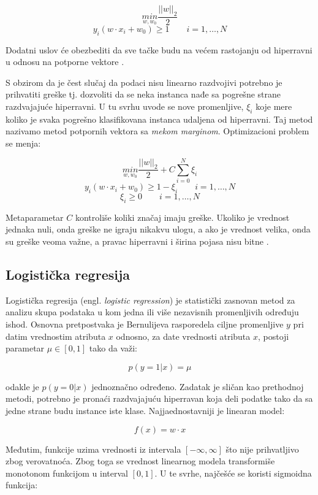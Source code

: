 $$ \underset{w, w_0}{min} \dfrac{||w||_2}{2}$$
$$ y_i(w \cdot x_i + w_0) \geq 1 \qquad i=1, \ldots, N $$
 
Dodatni uslov će obezbediti da sve tačke budu na većem rastojanju od hiperravni u odnosu na potporne vektore \cite{ml}.

S obzirom da je čest slučaj da podaci nisu linearno razdvojivi potrebno je prihvatiti greške tj. dozvoliti da se neka instanca nađe sa pogrešne strane razdvajajuće hiperravni. U tu svrhu uvode se nove promenljive, $\xi_i$ koje mere koliko je svaka pogrešno klasifikovana instanca udaljena od hiperravni. Taj metod nazivamo metod potpornih vektora sa \textit{mekom marginom}. Optimizacioni problem se menja:

$$ \underset{w, w_0}{min} \dfrac{||w||_2}{2} + C\sum_{i=0}^{N} \xi_i$$
$$ y_i(w \cdot x_i + w_0) \geq 1 - \xi_i \qquad i=1, \ldots, N $$
$$ \xi_i \geq 0  \qquad i=1, \ldots, N $$
 
Metaparametar $C$ kontroliše koliki značaj imaju greške. Ukoliko je vrednost jednaka nuli, onda greške ne igraju nikakvu ulogu, a ako je vrednost velika, onda su greške veoma važne, a pravac hiperravni i širina pojasa nisu bitne \cite{ml}. 


\subsection{Logistička regresija}

Logistička regresija (engl. \textit{logistic regression}) je statistički zasnovan metod za analizu skupa podataka u kom jedna ili više nezavisnih promenljivih određuju ishod. Osnovna pretpostvaka je Bernulijeva rasporedela ciljne promenljive $y$ pri datim vrednostim atributa $x$ odnosno, za date vrednosti atributa $x$, postoji parametar $\mu \in [0, 1]$ tako da važi:

$$ p(y = 1 | x) = \mu $$ 

\noindent odakle je $ p(y=0 | x)$  jednoznačno određeno.
Zadatak je sličan kao prethodnoj metodi, potrebno je pronaći razdvajajuću hiperravan koja deli podatke tako da sa jedne strane budu instance iste klase. Najjaednostavniji je linearan model:

$$f(x) = w \cdot x$$

Međutim, funkcije uzima vrednosti iz intervala $[-\infty, \infty]$ što nije prihvatljivo zbog verovatnoća. Zbog toga se vrednost linearnog modela transformiše monotonom funkcijom u interval $[0, 1]$. U te svrhe, najčešće se koristi sigmoidna funkcija:

